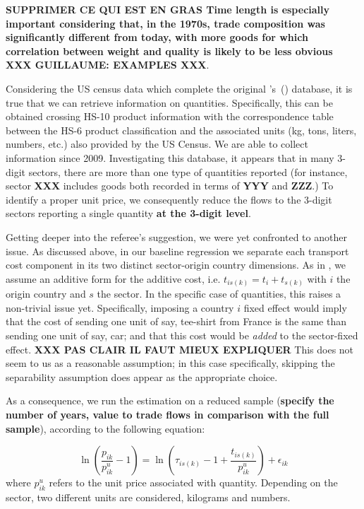 \documentclass[a4paper,11pt]{article}
\newcommand\cites[1]{\citeauthor{#1}'s\ (\citeyear{#1})}
\begin{document}
\textbf{SUPPRIMER CE QUI EST EN GRAS Time length is especially important considering that, in the 1970s, trade composition was significantly different from today, with more goods for which correlation between weight and quality is likely to be less obvious} \textbf{XXX GUILLAUME: EXAMPLES XXX}. 


Considering the US census data which complete the original \cites{hummels2007} database, it is true that we can retrieve information on quantities. Specifically, this can be obtained crossing HS-10 product information with the correspondence table between the HS-6 product classification and the associated units (kg, tons, liters, numbers, etc.) also provided by the US Census. We are able to collect information since 2009. Investigating this database, it appears that in many 3-digit sectors, there are more than one type of quantities reported (for instance, sector \textbf{XXX} includes goods both recorded in terms of \textbf{YYY} and \textbf{ZZZ}.) To identify a proper unit price, we consequently reduce the flows to the 3-digit sectors reporting a single quantity \textbf{at the 3-digit level}.


Getting deeper into the referee's suggestion, we were yet confronted to another issue. As discussed above, in our baseline regression we separate each transport cost component in its two distinct sector-origin country dimensions. As in \cite{Irrazabal_2015}, we assume an additive form for the additive cost, i.e. $t_{is(k)} = t_i+t_{s(k)}$ with $i$ the origin country and $s$ the sector. In the specific case of quantities, this raises a non-trivial issue yet. Specifically, imposing a country $i$ fixed effect would imply that the cost of sending one unit of say, tee-shirt from France is the same than sending one unit of say, car; and that this cost would be \textit{added} to the sector-fixed effect. \textbf{XXX PAS CLAIR IL FAUT MIEUX EXPLIQUER } This does not seem to us as a reasonable assumption; in this case specifically, skipping the separability assumption does appear as the appropriate choice.

As a consequence, we run the estimation on a reduced sample (\textbf{specify the number of years, value to trade flows in comparison with the full sample}), according to the following equation:

\begin{equation}
\ln\left(\frac{p_{ik}}{p^u_{ik}}-1 \right)= \ln \left(\tau_{is(k)} -1+\frac{t_{is(k)} }{p^u_{ik}} \right) + \epsilon_{ik} \label{eq:model_IetA}
\end{equation}
\noindent where $p^u_{ik}$ refers to the unit price associated with quantity. Depending on the sector, two different units are considered, kilograms and numbers.
\end{document}
